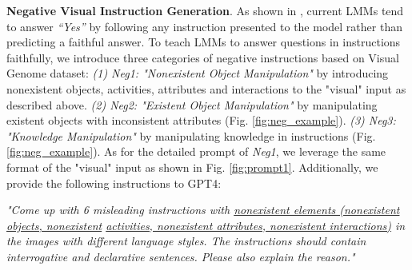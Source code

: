\textbf{Negative Visual Instruction Generation}. As shown in \citep{li2023evaluating}, current LMMs tend to answer \textit{“Yes”} by following any instruction presented to the model rather than predicting a faithful answer. 
To teach LMMs \citep{zhu2023minigpt, liu2023visual, gong2023multimodal, dai2023instructblip} to answer questions in instructions faithfully, we introduce three categories of negative instructions based on Visual Genome dataset: \textit{(1) Neg1: "Nonexistent Object Manipulation"} by introducing nonexistent objects, activities, attributes and interactions to the "visual" input as described above.
\textit{(2) Neg2: "Existent Object Manipulation"} by manipulating existent objects with inconsistent attributes (Fig. \ref{fig:neg_example}). \textit{(3) Neg3: "Knowledge Manipulation"} by manipulating knowledge in instructions (Fig. \ref{fig:neg_example}).
As for the detailed prompt of \textit{Neg1}, we leverage the same format of the "visual" input as shown in Fig. \ref{fig:prompt1}. Additionally, we provide the following instructions to GPT4: 

\textit{"Come up with 6 misleading instructions with \underline{nonexistent elements (nonexistent objects, nonexistent} \underline{activities, nonexistent attributes, nonexistent interactions)} in the images with different language styles. The instructions should contain interrogative and declarative sentences. Please also explain the reason."}

